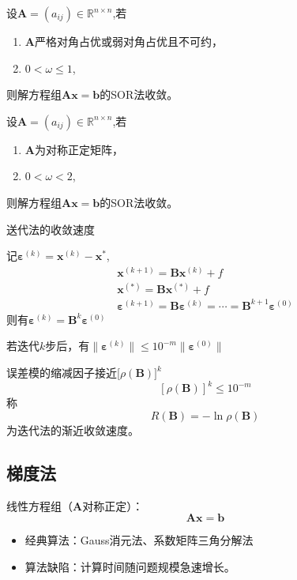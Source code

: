 \begin{theorem}
    设$\boldsymbol{A}=(a_{ij})\in\mathbb{R}^{n\times n}$,若
    \begin{enumerate}
        \item $\boldsymbol{A}$严格对角占优或弱对角占优且不可约，
        \item $0<\omega\leq1$,
    \end{enumerate}
    则解方程组$\boldsymbol{Ax}=\boldsymbol{b}$的SOR法收敛。
\end{theorem}
\begin{theorem}
    设$\boldsymbol{A}=(a_{ij})\in\mathbb{R}^{n\times n}$,若
    \begin{enumerate}
        \item $\boldsymbol{A}$为对称正定矩阵，
        \item $0< \omega < 2$,
    \end{enumerate}
    则解方程组$\boldsymbol{Ax}=\boldsymbol{b}$的SOR法收敛。
\end{theorem}
\begin{note}
    送代法的收敛速度

    记$\boldsymbol{\varepsilon}^{(k)}=\boldsymbol{x}^{(k)}-\boldsymbol{x}^{*}$,
    \[
        \begin{array}{l}
            \boldsymbol{x}^{(k+1)} = \boldsymbol{B}\boldsymbol{x}^{(k)}+f\\
            \boldsymbol{x}^{(*)} = \boldsymbol{B}\boldsymbol{x}^{(*)}+f\\
            \boldsymbol{\varepsilon}^{(k+1)}=\boldsymbol{B}\boldsymbol{\varepsilon}^{(k)} = \cdots =\boldsymbol{B}^{k+1}\boldsymbol{\varepsilon}^{(0)}
        \end{array}
    \]
    则有$\boldsymbol{\varepsilon}^{(k)}=\boldsymbol{B}^{k}\boldsymbol{\varepsilon}^{(0)}$

    若迭代$k$步后，有$\parallel\boldsymbol{\varepsilon}^{(k)}\parallel\leq10^{-m}\parallel\boldsymbol{\varepsilon}^{(0)}\parallel$

    误差模的缩减因子接近[$\rho(\boldsymbol{B})]^k$
    \[
        \boxed{[\rho(\boldsymbol{B})]^k\leq10^{-m}}
    \]
    称
    \[
        R(\boldsymbol{B})=-\ln\rho(\boldsymbol{B})
    \]
    为迭代法的渐近收敛速度。
\end{note}
\subsection{梯度法}
线性方程组（$\boldsymbol{A}$对称正定）：
\[
    \boldsymbol{Ax} = \boldsymbol{b}
\]
\begin{itemize}
    \item 经典算法：Gauss消元法、系数矩阵三角分解法
    \item 算法缺陷：计算时间随问题规模急速增长。
\end{itemize}

